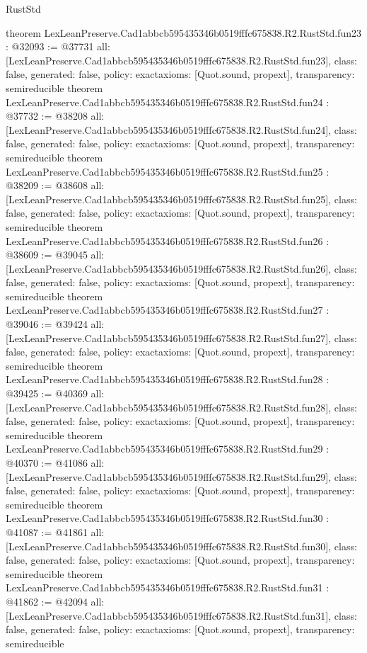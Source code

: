 \begin{lexlean}{RustStd}
\begin{coremodule}
{}
theorem LexLeanPreserve.Cad1abbcb595435346b0519fffc675838.R2.RustStd.fun23 : @32093 := @37731 {
  all: [LexLeanPreserve.Cad1abbcb595435346b0519fffc675838.R2.RustStd.fun23],
  class: false,
  generated: false,
  policy: exact{axioms: [Quot.sound, propext]},
  transparency: semireducible
}
theorem LexLeanPreserve.Cad1abbcb595435346b0519fffc675838.R2.RustStd.fun24 : @37732 := @38208 {
  all: [LexLeanPreserve.Cad1abbcb595435346b0519fffc675838.R2.RustStd.fun24],
  class: false,
  generated: false,
  policy: exact{axioms: [Quot.sound, propext]},
  transparency: semireducible
}
theorem LexLeanPreserve.Cad1abbcb595435346b0519fffc675838.R2.RustStd.fun25 : @38209 := @38608 {
  all: [LexLeanPreserve.Cad1abbcb595435346b0519fffc675838.R2.RustStd.fun25],
  class: false,
  generated: false,
  policy: exact{axioms: [Quot.sound, propext]},
  transparency: semireducible
}
theorem LexLeanPreserve.Cad1abbcb595435346b0519fffc675838.R2.RustStd.fun26 : @38609 := @39045 {
  all: [LexLeanPreserve.Cad1abbcb595435346b0519fffc675838.R2.RustStd.fun26],
  class: false,
  generated: false,
  policy: exact{axioms: [Quot.sound, propext]},
  transparency: semireducible
}
theorem LexLeanPreserve.Cad1abbcb595435346b0519fffc675838.R2.RustStd.fun27 : @39046 := @39424 {
  all: [LexLeanPreserve.Cad1abbcb595435346b0519fffc675838.R2.RustStd.fun27],
  class: false,
  generated: false,
  policy: exact{axioms: [Quot.sound, propext]},
  transparency: semireducible
}
theorem LexLeanPreserve.Cad1abbcb595435346b0519fffc675838.R2.RustStd.fun28 : @39425 := @40369 {
  all: [LexLeanPreserve.Cad1abbcb595435346b0519fffc675838.R2.RustStd.fun28],
  class: false,
  generated: false,
  policy: exact{axioms: [Quot.sound, propext]},
  transparency: semireducible
}
theorem LexLeanPreserve.Cad1abbcb595435346b0519fffc675838.R2.RustStd.fun29 : @40370 := @41086 {
  all: [LexLeanPreserve.Cad1abbcb595435346b0519fffc675838.R2.RustStd.fun29],
  class: false,
  generated: false,
  policy: exact{axioms: [Quot.sound, propext]},
  transparency: semireducible
}
theorem LexLeanPreserve.Cad1abbcb595435346b0519fffc675838.R2.RustStd.fun30 : @41087 := @41861 {
  all: [LexLeanPreserve.Cad1abbcb595435346b0519fffc675838.R2.RustStd.fun30],
  class: false,
  generated: false,
  policy: exact{axioms: [Quot.sound, propext]},
  transparency: semireducible
}
theorem LexLeanPreserve.Cad1abbcb595435346b0519fffc675838.R2.RustStd.fun31 : @41862 := @42094 {
  all: [LexLeanPreserve.Cad1abbcb595435346b0519fffc675838.R2.RustStd.fun31],
  class: false,
  generated: false,
  policy: exact{axioms: [Quot.sound, propext]},
  transparency: semireducible
}
\end{coremodule}
\end{lexlean}
